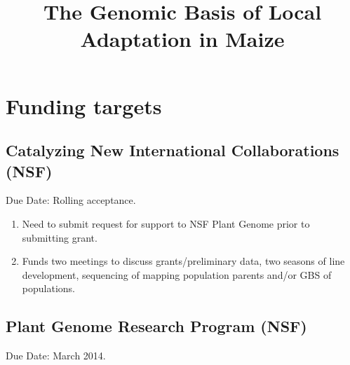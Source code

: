 \documentclass[]{article}
\begin{document}
\title{The Genomic Basis of Local Adaptation in Maize}

\maketitle

\section*{Funding targets} 

\subsection*{Catalyzing New International Collaborations (NSF)}
Due Date:  Rolling acceptance. 

\begin{enumerate}

\item Need to submit request for support to NSF Plant Genome prior to submitting grant.

\item Funds two meetings to discuss grants/preliminary data, two seasons of line development, sequencing of mapping population parents and/or GBS of populations.

\end{enumerate}

\subsection*{Plant Genome Research Program (NSF)}
Due Date: March 2014. 
\end{document}
